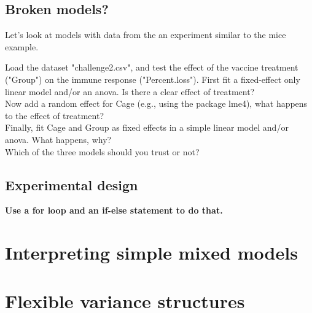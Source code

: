 \documentclass[12pt,a4paper]{scrartcl}\usepackage[]{graphicx}\usepackage[]{color}
\begin{document}
\subsection{Broken models?}

Let's look at models with data from the an experiment similar to the mice example.
\begin{Exercise}[difficulty=1, title={lm vs. lmer vs. lm+}]

Load the dataset "challenge2.csv", and test the effect of the vaccine treatment ("Group") on the immune response ("Percent.loss"). 
First fit a fixed-effect only linear model and/or an anova. Is there a clear effect of treatment?\\
Now add a random effect for Cage (e.g., using the package lme4), what happens to the effect of treatment?\\
Finally, fit Cage and Group as fixed effects in a simple linear model and/or anova. What happens, why?\\
Which of the three models should you trust or not?

\end{Exercise}




\subsection{Experimental design}


\begin{Exercise}[difficulty=1]
\textbf{Use a for loop and an if-else statement to do that.}
\end{Exercise}


\section{Interpreting simple mixed models}

\section{Flexible variance structures}
\end{document}
